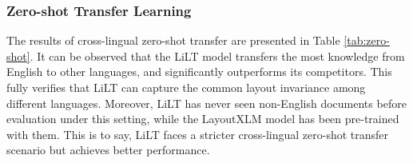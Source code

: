 \documentclass[11pt]{article}
\begin{document}
\subsubsection{Zero-shot Transfer Learning}
The results of cross-lingual zero-shot transfer  are presented in  Table \ref{tab:zero-shot}. 
It can be observed that  the LiLT model transfers the most knowledge from English to other languages, and significantly outperforms its competitors. This fully verifies that LiLT can capture the common layout invariance among different languages.
Moreover, LiLT has never seen non-English  documents before evaluation under this setting, while the LayoutXLM model has been pre-trained with them. This is to say, LiLT faces a  stricter  cross-lingual zero-shot transfer scenario but achieves better performance. 
 
\begin{table*}[!]
\centering
{}
\end{table*}
\end{document}
